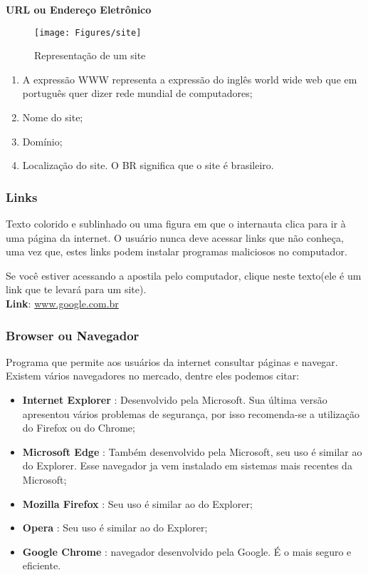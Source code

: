 \documentclass[hidelinks,12pt]{article}
\begin{document}
\textbf{URL ou Endereço Eletrônico}

\begin{figure}[!h]
	\centering
	\texttt{[image: Figures/site]}
	\label{fig:site}
	\caption{Representação de um site}
\end{figure}

\begin{enumerate}
	\item A expressão WWW representa a expressão do inglês world wide web que em português quer dizer rede mundial de computadores;

	\item Nome do site;

	\item Domínio;

	\item Localização do site. O BR significa que o site é brasileiro.
\end{enumerate}


\subsubsection{Links}
Texto colorido e sublinhado ou uma figura em que o internauta clica para ir à uma página da internet. O usuário nunca deve acessar links que não conheça, uma vez que, estes links podem instalar programas maliciosos no computador.

Se você estiver acessando a apostila pelo computador, clique neste texto(ele é um link que te levará para um site).\\
\textbf{Link}: \url{www.google.com.br}


\subsubsection{Browser ou Navegador}

Programa que permite aos usuários da internet consultar páginas e navegar. Existem vários navegadores no mercado, dentre eles podemos citar:

\begin{itemize}
	\item \textbf{Internet Explorer} : Desenvolvido pela Microsoft. Sua última versão apresentou vários problemas de segurança, por isso recomenda-se a utilização do Firefox ou do Chrome;
	\item \textbf{Microsoft Edge} : Também desenvolvido pela Microsoft, seu uso é similar ao do Explorer. Esse navegador ja vem instalado em sistemas mais recentes da Microsoft;
	\item \textbf{Mozilla Firefox} : Seu uso é similar ao do Explorer;
	\item \textbf{Opera} : Seu uso é similar ao do Explorer;
	\item \textbf{Google Chrome} : navegador desenvolvido pela Google. É o mais seguro e eficiente.
\end{itemize}
\end{document}
